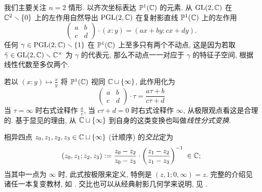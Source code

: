 我们主要关注 $n=2$ 情形. 以齐次坐标表达 $\mathbb{P}^1(\mathbb{C})$ 的元素. 从 $\operatorname{GL}(2,\mathbb{C})$ 在 $\mathbb{C}^2 \smallsetminus \{0\}$ 上的左作用自然导出 $\operatorname{PGL}(2,\mathbb{C})$ 在复射影直线 $\mathbb{P}^1(\mathbb{C})$ 上的左作用
\[ \begin{pmatrix} a & b \\ c & d \end{pmatrix} \cdot (x:y) = (ax+by:cx+dy). \]
任何 $\gamma \in \operatorname{PGL}(2,\mathbb{C}) \smallsetminus \{1\}$ 在 $\mathbb{P}^1(\mathbb{C})$ 上至多只有两个不动点, 这是因为若取 $\tilde{\gamma} \in \operatorname{GL}(2,\mathbb{C}) \smallsetminus \mathbb{C}^\times$ 为 $\gamma$ 的代表元, 那么不动点一一对应于 $\gamma$ 的特征子空间, 根据线性代数至多仅两个.

若以 $(x:y) \mapsto \frac{x}{y}$ 将 $\mathbb{P}^1(\mathbb{C})$ 视同 $\mathbb{C} \sqcup \{\infty\}$, 此作用化为
\[ \begin{pmatrix} a & b \\ c & d \end{pmatrix} \cdot \tau = \dfrac{a\tau + b}{c\tau + d} \]
当 $\tau = \infty$ 时右式诠释作 $\frac{a}{c}$, 当 $c\tau + d=0$ 时右式诠释作 $\infty$, 从极限观点看这是合理的. 基于显见的理由, 从 $\mathbb{C} \sqcup \{\infty\}$ 到自身的这类变换也叫做\emph{线性分式变换}. 

相异四点 $z_0, z_1, z_2, z_3 \in \mathbb{C} \sqcup \{\infty\}$ (计顺序) 的\emph{交比}定为
 
\[ (z_0, z_1; z_2, z_3) := \frac{z_0 - z_2}{z_0 - z_3} \cdot \left( \frac{z_1 - z_2}{z_1 - z_3}\right)^{-1} \; \in \mathbb{C}; \]
当其中一点为 $\infty$ 时, 此式按极限来定义, 特例是 $(z, 1; 0, \infty) = z$. 完整的介绍见诸任一本复变教材, 如 \cite[\S 2.6 定义 2]{TW06}. 交比也可以从经典射影几何学来说明, 见 \cite[定义 5.42]{Xi18}.

